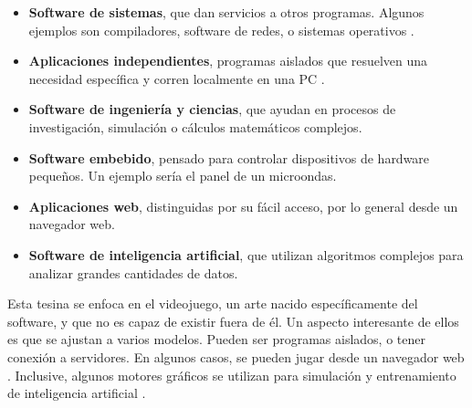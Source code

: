 \begin{itemize}
    \item \textbf{Software de sistemas}, que dan servicios a otros programas. Algunos ejemplos son compiladores, software de redes, o sistemas operativos \cite{pressmanIngenieriaSoftwareEnfoque2013}.
    \item \textbf{Aplicaciones independientes}, programas aislados que resuelven una necesidad específica y corren localmente en una PC \cite{sommervilleIngenieriaSoftware9a2011,pressmanIngenieriaSoftwareEnfoque2013}.
    \item \textbf{Software de ingeniería y ciencias}, que ayudan en procesos de investigación, simulación o cálculos matemáticos complejos.
    \item \textbf{Software embebido}, pensado para controlar dispositivos de hardware pequeños. Un ejemplo sería el panel de un microondas.
    \item \textbf{Aplicaciones web}, distinguidas por su fácil acceso, por lo general desde un navegador web.
    \item \textbf{Software de inteligencia artificial}, que utilizan algoritmos complejos para analizar grandes cantidades de datos.
\end{itemize}
\par
Esta tesina se enfoca en el videojuego, un arte nacido específicamente del software, y que no es capaz de existir fuera de él. Un aspecto interesante de ellos es que se ajustan a varios modelos. Pueden ser programas aislados, o tener conexión a servidores. En algunos casos, se pueden jugar desde un navegador web \cite{PhaserFastFun}. Inclusive, algunos motores gráficos se utilizan para simulación y entrenamiento de inteligencia artificial \cite{MLAgentsOverviewML,UnrealEngineAdvanced}.